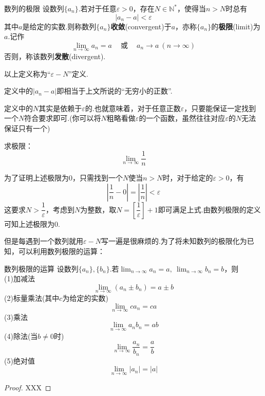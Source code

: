 \documentclass[lang=cn, zihao=5]{elegantbook}
\newcommand{\cor}{~\textit{或}~}
\begin{document}
\begin{definition}{数列的极限}
	设数列$\{ a_n \}$.若对于任意$\varepsilon >0$，存在$N \in \mathbb{N}^{*}$，使得当$n > N$时总有$$|a_n-a|<\varepsilon$$
	其中$a$是给定的实数.则称数列$\{ a_n \}$\textbf{收敛}(convergent)于$a$，亦称$\{ a_n \}$的\textbf{极限}(limit)为$a$.记作$$\lim_{n \to \infty}{a_n}=a \quad \cor \quad a_n \to a~(n \to \infty)$$
	否则，称该数列\textbf{发散}(divergent).
\end{definition}
\begin{remark}
	以上定义称为“$\varepsilon - N$”定义.
\end{remark}
\begin{remark}
	定义中的$|a_n-a|$即相当于上文所说的“无穷小的正数”.
\end{remark}
\begin{remark}
	定义中的$N$其实是依赖于$\varepsilon$的.也就意味着，对于任意正数$\varepsilon$，只要能保证一定找到一个$N$符合要求即可.(你可以将$N$粗略看做$\varepsilon$的一个函数，虽然往往对应$\varepsilon$的$N$无法保证只有一个)
\end{remark}

\begin{example}
	求极限：$$\lim_{n \to \infty} \frac{1}{n}$$
\end{example}
\begin{solution}
	为了证明上述极限为$0$，只需找到一个$N$使当$n > N$时，对于给定的$\varepsilon > 0$，有$$\left| \frac{1}{n}-0 \right| = \left| \frac{1}{n} \right| < \varepsilon$$
	这要求$N>\dfrac{1}{\varepsilon}$，考虑到$N$为整数，取$N=\left[ \dfrac{1}{\varepsilon} \right]+1$即可满足上式.由数列极限的定义可知上述极限为$0$.
\end{solution}

但是每遇到一个数列就用$\varepsilon - N$写一遍是很麻烦的.为了将未知数列的极限化为已知，可以利用数列极限的运算：

\begin{theorem}{数列极限的运算} %
	设数列$\{ a_n \},\{ b_n \}$.若$\lim_{n \to \infty} a_n=a,~\lim_{n \to \infty} b_n=b$，则 \\
	(1)加减法$$\lim_{n \to \infty}{(a_n \pm b_n)} = a \pm b$$
	(2)标量乘法(其中$c$为给定的实数)$$\lim_{n \to \infty}{ca_n}=ca$$
	(3)乘法$$\lim_{n \to \infty}{a_nb_n} = ab$$
	(4)除法(当$b \neq 0$时)$$\lim_{n \to \infty}{\frac{a_n}{b_n}} = \frac{a}{b}$$
	(5)绝对值$$\lim_{n \to \infty}{|a_n|} = |a|$$
\end{theorem}
\begin{proof}
	XXX
\end{proof}
\end{document}
